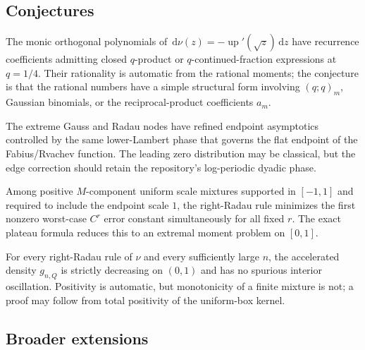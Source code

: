 \documentclass[11pt,oneside]{article}
\numberwithin{equation}{section}
\theoremstyle{definition}
\theoremstyle{remark}
\newcommand{\Up}{\operatorname{up}}
\newcommand{\dd}{\,\mathrm d}
\begin{document}
\subsection{Conjectures}

\begin{conjecture}
\label{p3:conj:q-orthogonal}
The monic orthogonal polynomials of
$\dd\nu(z)=-\Up'(\sqrt z)\dd z$ have recurrence coefficients admitting closed
$q$-product or $q$-continued-fraction expressions at $q=1/4$.  Their rationality is
automatic from the rational moments; the conjecture is that the rational numbers have a
simple structural form involving $(q;q)_m$, Gaussian binomials, or the reciprocal-product
coefficients $a_m$.
\end{conjecture}

\begin{conjecture}
\label{p3:conj:lambert-edge}
The extreme Gauss and Radau nodes have refined endpoint asymptotics controlled by the
same lower-Lambert phase that governs the flat endpoint of the Fabius/Rvachev function.
The leading zero distribution may be classical, but the edge correction should retain
the repository's log-periodic dyadic phase.
\end{conjecture}

\begin{conjecture}
\label{p3:conj:minimax}
Among positive $M$-component uniform scale mixtures supported in $[-1,1]$ and required
to include the endpoint scale $1$, the right-Radau rule minimizes the first nonzero
worst-case $C^r$ error constant simultaneously for all fixed $r$.  The exact plateau
formula reduces this to an extremal moment problem on $[0,1]$.
\end{conjecture}

\begin{conjecture}
For every right-Radau rule of $\nu$ and every sufficiently large $n$, the accelerated
density $g_{n,Q}$ is strictly decreasing on $(0,1)$ and has no spurious interior
oscillation.  Positivity is automatic, but monotonicity of a finite mixture is not; a
proof may follow from total positivity of the uniform-box kernel.
\end{conjecture}

\subsection{Broader extensions}
\end{document}
